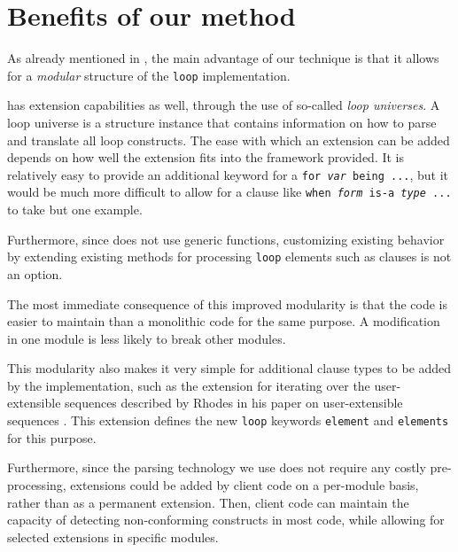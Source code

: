 \section{Benefits of our method}
\label{sec-benefits}
 
As already mentioned in ,
the main advantage of our technique is that it allows for a
\emph{modular} structure of the \texttt{loop} implementation.

\mitloop{} has extension capabilities as well, through the use of
so-called \emph{loop universes}.  A loop universe is a structure
instance that contains information on how to parse and translate all
loop constructs.  The ease with which an extension can be added
depends on how well the extension fits into the framework provided.
It is relatively easy to provide an additional keyword for a
\texttt{for \emph{var} being ...}, but it would be much more difficult
to allow for a clause like \texttt{when \emph{form} is-a \emph{type}
  ...} to take but one example.

Furthermore, since \mitloop{} does not use generic functions,
customizing existing behavior by extending existing methods for
processing \texttt{loop} elements such as clauses is not an option.

The most immediate consequence of this improved modularity is that the
code is easier to maintain than a monolithic code for the same
purpose.  A modification in one module is less likely to break other
modules.

This modularity also makes it very simple for additional clause types
to be added by the \commonlisp{} implementation, such as the extension
for iterating over the user-extensible sequences described by Rhodes
in his paper on user-extensible sequences
\cite{Rhodes:2007:USC:1622123.1622138}.  This extension defines the
new \texttt{loop} keywords \texttt{element} and \texttt{elements} for
this purpose.

Furthermore, since the parsing technology we use does not require any
costly pre-processing, extensions could be added by client code on a
per-module basis, rather than as a permanent extension.  Then, client
code can maintain the capacity of detecting non-conforming constructs
in most code, while allowing for selected extensions in specific
modules.
